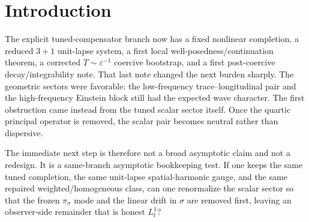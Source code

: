 \documentclass[11pt]{article}
\begin{document}
\begin{abstract}
The verdict is therefore negative at the present disciplined scope. This first renormalized same-branch scalar test does \emph{not} produce an \(L_t^1\) observer-side remainder in the same repaired weighted/homogeneous class around the exact flat target on generic small data. The failure is not a loss of the tuned local/coercive architecture; that architecture is unchanged. The failure is that the frozen scalar momentum remains a genuine observer-side source even after the linear drift in \(\sigma\) is subtracted. The correct next fallback, if the tuned branch remains active, is therefore a narrower momentum-suppressed sub-branch test rather than any broader asymptotic or nonlinear-stability claim on the generic tuned branch.
\end{abstract}

\section{Introduction}

The explicit tuned-compensator branch now has a fixed nonlinear completion, a reduced \(3+1\) unit-lapse system, a first local well-posedness/continuation theorem, a corrected \(T\sim\varepsilon^{-1}\) coercive bootstrap, and a first post-coercive decay/integrability note. That last note changed the next burden sharply. The geometric sectors were favorable: the low-frequency trace--longitudinal pair and the high-frequency Einstein block still had the expected wave character. The first obstruction came instead from the tuned scalar sector itself. Once the quartic principal operator is removed, the scalar pair becomes neutral rather than dispersive.

The immediate next step is therefore not a broad asymptotic claim and not a redesign. It is a same-branch asymptotic bookkeeping test. If one keeps the same tuned completion, the same unit-lapse spatial-harmonic gauge, and the same repaired weighted/homogeneous class, can one renormalize the scalar sector so that the frozen \(\pi_\sigma\) mode and the linear drift in \(\sigma\) are removed first, leaving an observer-side remainder that is honest \(L_t^1\)?
\end{document}
